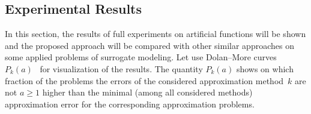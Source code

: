 \begin{multicols}{2}
\section{Experimental Results}
\label{experiments}

\noindent
In this section, the results of full experiments on artificial 
functions will be shown and the proposed approach will be compared with other similar approaches 
on some applied problems of surrogate modeling.
Let use Dolan--More curves $P_k(a)$~\cite{DolanMore} for visualization of the results.
The quantity $P_k(a)$ shows on which fraction of the problems the errors of the 
considered approximation method~$k$ are not $a\geq 1$ higher than the minimal (among 
all considered methods) approximation error for the corresponding approximation problems.
{ %

}

\begin{figure*} %
\vspace*{1pt}
 \begin{center}
 \mbox{%
 \epsfxsize=162.066mm
 }
 \end{center}
 \vspace*{-9pt}
  \label{dm_artificial_median}
  \vspace*{3pt}
\end{figure*}

\begin{table*}[b]\small
\vspace*{-6pt}
\begin{center}
  \vspace*{2ex}
  

\end{center}
\end{table*}
\end{multicols}
